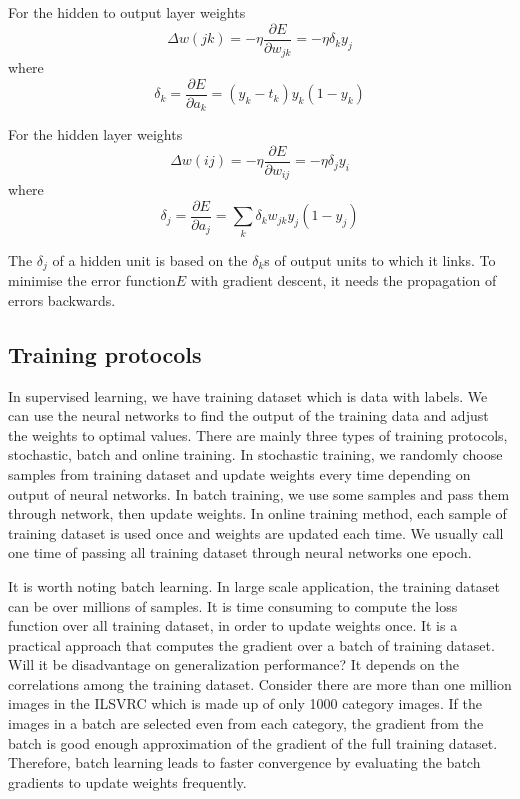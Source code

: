 For the hidden to output layer weights
\begin{equation}\label{eq:h2oBP}
\Delta w(jk) = -\eta \frac{\partial E}{\partial w_{jk}} = -\eta \delta_{k}y_{j}
\end{equation}
where $$\delta_{k} = \frac{\partial E}{\partial a_{k}} = (y_{k} - t_{k})y_{k}(1 - y_{k})$$

For the hidden layer weights
\begin{equation}\label{eq:hiddenBP}
\Delta w(ij) = -\eta \frac{\partial E}{\partial w_{ij}} = -\eta \delta_{j}y_{i}
\end{equation}
where $$\delta_{j} = \frac{\partial E}{\partial a_{j}} = \displaystyle\sum_{k} \delta_{k}w_{jk}y_{j}(1 - y_{j})$$

The $\delta_{j}$ of a hidden unit is based on the $\delta_{k}$s of output units to which it links. To minimise the error function$E$ with gradient descent, it needs the propagation of errors backwards.

\subsection{Training protocols}

In supervised learning, we have training dataset which is data with labels. We can use the neural networks to find the output of the training data and adjust the weights to optimal values. There are mainly  three types of training protocols, stochastic, batch and online training. In stochastic training, we randomly choose samples from training dataset and update weights every time depending on output of neural networks. In batch training, we use some samples and pass them through network, then update weights. In online training method, each sample of training dataset is used once and weights are updated each time. We usually call one time of passing all training dataset through neural networks one epoch.

It is worth noting batch learning. In large scale application, the training dataset can be over millions of samples. It is time consuming to compute the loss function over all training dataset, in order to update weights once. It is a practical approach that computes the gradient over a batch of training dataset. Will it be disadvantage on generalization performance? It depends on the correlations among the training dataset. Consider there are more than one million images in the ILSVRC which is made up of only 1000 category images. If the images in a batch are selected even from each category, the gradient from the batch is good enough approximation of the gradient of the full training dataset. Therefore, batch learning leads to faster convergence by evaluating the batch gradients to update weights frequently.

